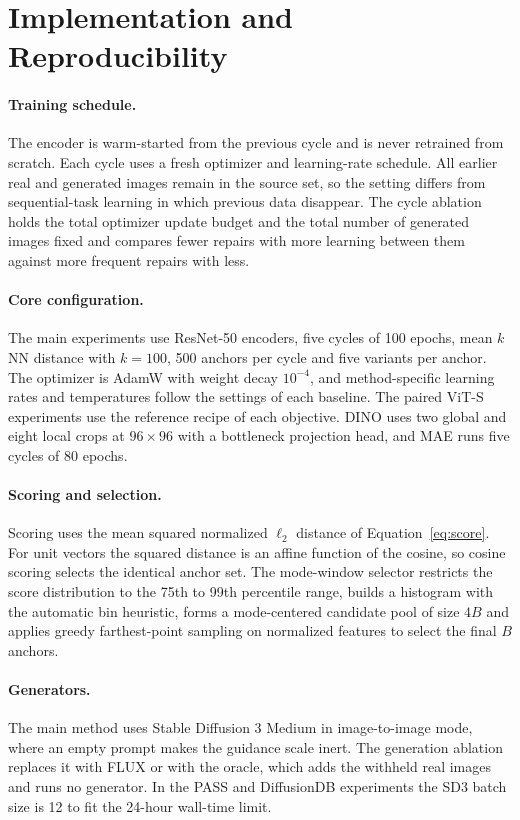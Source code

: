 \documentclass{article}
\begin{document}
\section{Implementation and Reproducibility}
\label{app:implementation}

\paragraph{Training schedule.} The encoder is warm-started from the previous cycle and is never retrained from scratch. Each cycle uses a fresh optimizer and learning-rate schedule. All earlier real and generated images remain in the source set, so the setting differs from sequential-task learning in which previous data disappear. The cycle ablation holds the total optimizer update budget and the total number of generated images fixed and compares fewer repairs with more learning between them against more frequent repairs with less.

\paragraph{Core configuration.}
The main experiments use ResNet-50 encoders, five cycles of 100 epochs, mean $k$NN distance with $k=100$, 500 anchors per cycle and five variants per anchor. The optimizer is AdamW with weight decay $10^{-4}$, and method-specific learning rates and temperatures follow the settings of each baseline. The paired ViT-S experiments use the reference recipe of each objective. DINO uses two global and eight local crops at $96\times96$ with a bottleneck projection head, and MAE runs five cycles of 80 epochs.

\paragraph{Scoring and selection.}
Scoring uses the mean squared normalized $\ell_2$ distance of Equation~\ref{eq:score}. For unit vectors the squared distance is an affine function of the cosine, so cosine scoring selects the identical anchor set. The mode-window selector restricts the score distribution to the 75th to 99th percentile range, builds a histogram with the automatic bin heuristic, forms a mode-centered candidate pool of size $4B$ and applies greedy farthest-point sampling on normalized features to select the final $B$ anchors.

\paragraph{Generators.}
The main method uses Stable Diffusion 3 Medium in image-to-image mode, where an empty prompt makes the guidance scale inert. The generation ablation replaces it with FLUX or with the oracle, which adds the withheld real images and runs no generator. In the PASS and DiffusionDB experiments the SD3 batch size is 12 to fit the 24-hour wall-time limit.
\end{document}
